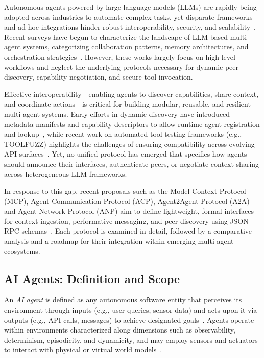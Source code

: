 \documentclass{article}
\begin{document}
Autonomous agents powered by large language models (LLMs) are rapidly being adopted across industries to automate complex tasks, yet disparate frameworks and ad-hoc integrations hinder robust interoperability, security, and scalability~\cite{bommasani2021opportunities,mialon2023augmented}.  Recent surveys have begun to characterize the landscape of LLM-based multi-agent systems, categorizing collaboration patterns, memory architectures, and orchestration strategies~\cite{tran2025multi,guo2024survey,yan2025beyond}.  However, these works largely focus on high-level workflows and neglect the underlying protocols necessary for dynamic peer discovery, capability negotiation, and secure tool invocation.

Effective interoperability—enabling agents to discover capabilities, share context, and coordinate actions—is critical for building modular, reusable, and resilient multi-agent systems.  Early efforts in dynamic discovery have introduced metadata manifests and capability descriptors to allow runtime agent registration and lookup~\cite{sheriff2024dynamic}, while recent work on automated tool testing frameworks (e.g., TOOLFUZZ) highlights the challenges of ensuring compatibility across evolving API surfaces~\cite{milev2024toolfuzz}.  Yet, no unified protocol has emerged that specifies how agents should announce their interfaces, authenticate peers, or negotiate context sharing across heterogeneous LLM frameworks.

In response to this gap, recent proposals such as the Model Context Protocol (MCP), Agent Communication Protocol (ACP), Agent2Agent Protocol (A2A)  and Agent Network Protocol (ANP) aim to define lightweight, formal interfaces for context ingestion, performative messaging, and peer discovery using JSON-RPC schemas~\cite{mcp2024introduction,beeai2024acp,google2024a2a, anp2024github, anp2024website}. Each protocol is examined in detail, followed by a comparative analysis and a roadmap for their integration within emerging multi-agent ecosystems.


\subsection{AI Agents: Definition and Scope}
\label{sec:definition}

An \emph{AI agent} is defined as any autonomous software entity that perceives its environment through inputs (e.g., user queries, sensor data) and acts upon it via outputs (e.g., API calls, messages) to achieve designated goals~\cite{russell2010aima}.  Agents operate within environments characterized along dimensions such as observability, determinism, episodicity, and dynamicity, and may employ sensors and actuators to interact with physical or virtual world models~\cite{russell2010aima,wooldridge2009introduction}.  
\end{document}
